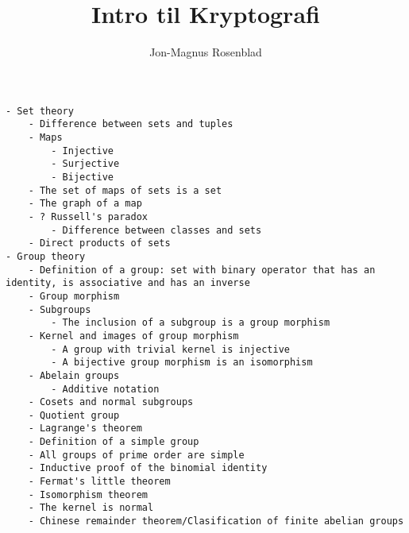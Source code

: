 \documentclass[norks]{article}
\author{Jon-Magnus Rosenblad}
\title{Intro til Kryptografi}
\begin{document}
\maketitle

\tableofcontents
\listoftodos

%


\begin{verbatim}
- Set theory
    - Difference between sets and tuples
    - Maps
        - Injective
        - Surjective
        - Bijective
    - The set of maps of sets is a set
    - The graph of a map
    - ? Russell's paradox
        - Difference between classes and sets
    - Direct products of sets
- Group theory
    - Definition of a group: set with binary operator that has an identity, is associative and has an inverse
    - Group morphism
    - Subgroups
        - The inclusion of a subgroup is a group morphism
    - Kernel and images of group morphism
        - A group with trivial kernel is injective
        - A bijective group morphism is an isomorphism
    - Abelain groups
        - Additive notation
    - Cosets and normal subgroups
    - Quotient group
    - Lagrange's theorem
    - Definition of a simple group
    - All groups of prime order are simple
    - Inductive proof of the binomial identity
    - Fermat's little theorem
    - Isomorphism theorem
    - The kernel is normal
    - Chinese remainder theorem/Clasification of finite abelian groups
\end{verbatim}

\printbibliography
\end{document}
